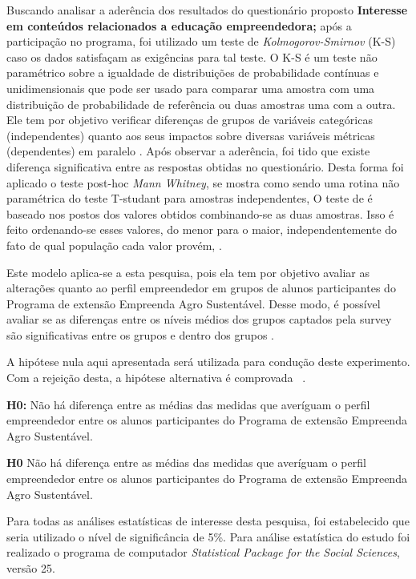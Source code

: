 Buscando analisar a aderência dos resultados do questionário proposto \textbf{Interesse em conteúdos relacionados a educação empreendedora;} após a participação no programa, foi utilizado um teste de \textit{Kolmogorov-Smirnov} (K-S) caso os dados satisfaçam as exigências para tal teste. O K-S é um teste não paramétrico sobre a igualdade de distribuições de probabilidade contínuas e unidimensionais que pode ser usado para comparar uma amostra com uma distribuição de probabilidade de referência ou duas amostras uma com a outra. Ele tem por objetivo verificar diferenças de grupos de variáveis categóricas (independentes) quanto aos seus impactos sobre diversas variáveis métricas (dependentes) em paralelo  \cite{hair_alise_2009}. Após observar a aderência, foi tido que existe diferença significativa entre as respostas obtidas no questionário. Desta forma foi aplicado o teste post-hoc \textit{Mann Whitney}, se mostra como sendo uma rotina não paramétrica do teste T-studant para amostras independentes, O teste de é baseado nos postos dos valores obtidos combinando-se as duas amostras. Isso é feito ordenando-se esses valores, do menor para o maior, independentemente do fato de qual população cada valor provém, \cite{matsouaka_optimal_2018}.

Este modelo aplica-se a esta pesquisa, pois ela tem por objetivo avaliar as alterações quanto ao perfil empreendedor em grupos de alunos participantes do Programa de extensão Empreenda Agro Sustentável. Desse modo, é possível avaliar se as diferenças entre os níveis médios dos grupos captados pela \textit{}{survey} são significativas entre os grupos e dentro dos grupos \cite{rocha_avaliacao_2014}. 

A hipótese nula aqui apresentada será utilizada para condução deste experimento. Com a rejeição desta, a hipótese alternativa é comprovada \ \cite{hair_alise_2009}.

\textbf{H0:} Não há diferença entre as médias das medidas que averíguam o perfil empreendedor entre os alunos participantes do Programa de extensão Empreenda Agro Sustentável.

\textbf{H0} Não há diferença entre as médias das medidas que averíguam o perfil empreendedor entre os alunos participantes do Programa de extensão Empreenda Agro Sustentável.

Para todas as análises estatísticas de interesse desta pesquisa, foi estabelecido que seria utilizado o nível  de  significância  de  5\%.  Para  análise  estatística  do  estudo  foi  realizado o  programa  de  computador \textit{Statistical Package for the Social Sciences}, \cite{ibm_corp_ibm_2017} versão 25. 


